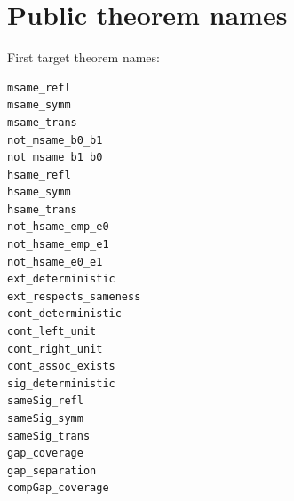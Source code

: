 \section{Public theorem names}

First target theorem names:
\begin{verbatim}
msame_refl
msame_symm
msame_trans
not_msame_b0_b1
not_msame_b1_b0
hsame_refl
hsame_symm
hsame_trans
not_hsame_emp_e0
not_hsame_emp_e1
not_hsame_e0_e1
ext_deterministic
ext_respects_sameness
cont_deterministic
cont_left_unit
cont_right_unit
cont_assoc_exists
sig_deterministic
sameSig_refl
sameSig_symm
sameSig_trans
gap_coverage
gap_separation
compGap_coverage
\end{verbatim}
